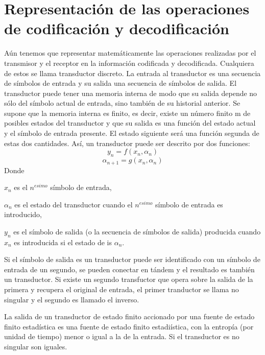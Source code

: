 \chapter{Representaci\'{o}n de las operaciones de codificaci\'{o}n y decodificaci\'{o}n}
\label{sec:8}

A\'{u}n tenemos que representar matem\'{a}ticamente las operaciones realizadas por el transmisor y el receptor en la informaci\'{o}n codificada y decodificada. Cualquiera de estos se llama transductor discreto. La entrada al transductor es una secuencia de s\'{i}mbolos de entrada y su salida una secuencia de s\'{i}mbolos de salida. El transductor puede tener una memoria interna de modo que su salida depende no s\'{o}lo del s\'{i}mbolo actual de entrada, sino tambi\'{e}n de su historial anterior. Se supone que la memoria interna es finito, es decir, existe un n\'{u}mero finito m de posibles estados del transductor y que su salida es una funci\'{o}n del estado actual y el s\'{i}mbolo de entrada presente. El estado siguiente ser\'{a} una funci\'{o}n segunda de estas dos cantidades. As\'{i}, un transductor puede ser descrito por dos funciones:
\begin{equation}y_{n}= f\left ( x_{n}, \alpha_{n} \right )\end{equation}
\begin{equation}\alpha_{n+1} = g\left ( x_{n}, \alpha_{n} \right )\end{equation}
Donde

$x_{n}$ es el $n^{esimo}$ s\'{i}mbolo de entrada,

$\alpha_{n}$ es el estado del transductor cuando el $n^{esimo}$ s\'{i}mbolo de entrada es introducido,

$y_{n}$ es el s\'{i}mbolo de salida (o la secuencia de s\'{i}mbolos de salida) producida cuando $x_{n}$ es introducida si el estado de is $\alpha_{n}$.

Si el s\'{i}mbolo de salida es un transductor puede ser identificado con un s\'{i}mbolo de entrada de un segundo, se pueden conectar en t\'{a}ndem y el resultado es tambi\'{e}n un transductor. Si existe un segundo transfuctor que opera sobre la salida de la primera y recupera el original de entrada, el primer tranductor se llama no singular y el segundo es llamado el inverso.

\begin{theorem}
\label{th:7}
La salida de un transductor de estado finito accionado por una fuente de estado finito estad\'{i}stica es una fuente de estado finito estadi\'{i}stica, con la entrop\'{i}a (por unidad de tiempo) menor o igual a la de la entrada. Si el transductor es no singular son iguales.\end{theorem}

